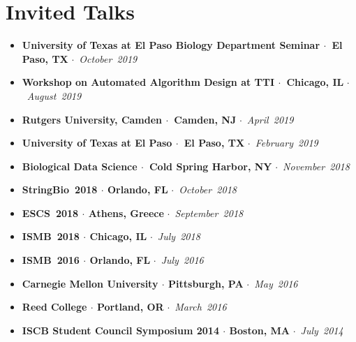 \documentclass[10pt,letterpaper]{article}
\newcommand{\bigdot}{$\cdot$\xspace}
\begin{document}
\section*{Invited Talks}
\begin{itemize}[leftmargin=*,labelindent=5pt,itemindent=-15pt]
  \item \textbf{University of Texas at El Paso Biology Department Seminar \bigdot~El Paso, TX} \bigdot~\textit{October~2019} %
  \item \textbf{Workshop on Automated Algorithm Design at TTI \bigdot~Chicago, IL} \bigdot~\textit{August~2019}%
  \item \textbf{Rutgers University, Camden \bigdot~Camden, NJ} \bigdot~\textit{April~2019} %
  \item \textbf{University of Texas at El Paso \bigdot~El Paso, TX} \bigdot~\textit{February~2019}%
  \item \textbf{Biological Data Science \bigdot~Cold Spring Harbor, NY} \bigdot~\textit{November~2018} %
   \item \textbf{StringBio~2018 \bigdot Orlando, FL} \bigdot~\textit{October~2018}%
   \item \textbf{ESCS~2018 \bigdot Athens, Greece} \bigdot~\textit{September~2018} %
    \item \textbf{ISMB~2018 \bigdot Chicago, IL} \bigdot~\textit{July~2018}%
    \item \textbf{ISMB~2016 \bigdot Orlando, FL} \bigdot~\textit{July~2016}%
    \item \textbf{Carnegie Mellon University \bigdot Pittsburgh, PA} \bigdot~\textit{May~2016}%
    \item \textbf{Reed College \bigdot Portland, OR} \bigdot~\textit{March~2016}%
    \item \textbf{ISCB Student Council Symposium 2014 \bigdot  Boston, MA} \bigdot~\textit{July~2014} %
   
\end{itemize}
\end{document}
